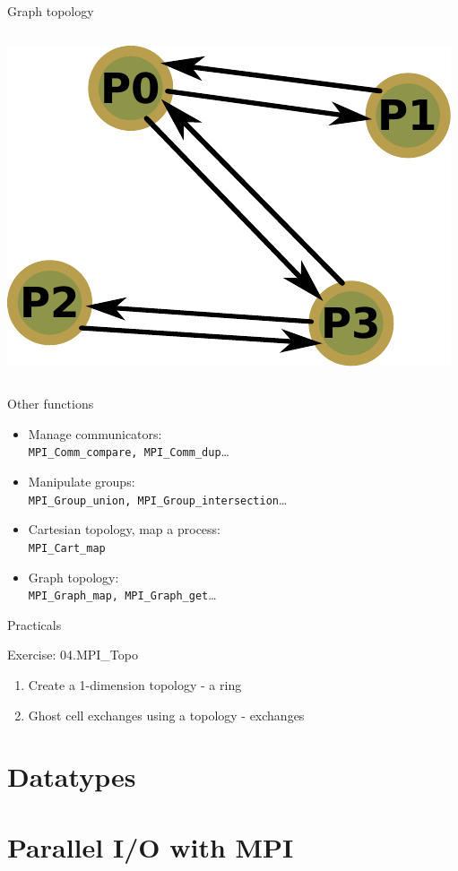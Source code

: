 \documentclass[aspectratio=43]{beamer}
\begin{document}
\begin{frame}[fragile]{Graph topology}
\begin{columns}
    \begin{column}{0.2\paperwidth}
\includegraphics[scale=0.36]{04.MPI_Topo/graph.pdf}
    \end{column}
\end{columns}

\end{frame}


\begin{frame}[fragile]{Other functions}
\begin{itemize}
    \item Manage communicators:\\\hspace{1cm}\verb+MPI_Comm_compare, MPI_Comm_dup+\ldots
    \item Manipulate groups:\\\hspace{1cm}\verb+MPI_Group_union, MPI_Group_intersection+\ldots
    \item Cartesian topology, map a process:\\\hspace{1cm}\verb+MPI_Cart_map+
    \item Graph topology:\\\hspace{1cm}\verb+MPI_Graph_map, MPI_Graph_get+\ldots
\end{itemize}
\end{frame}


\begin{frame}{Practicals}
    \begin{brown2block}{Exercise: 04.MPI\_Topo}
    \begin{enumerate}
        \item Create a 1-dimension topology - a ring
        \item Ghost cell exchanges using a topology - exchanges
    \end{enumerate}
    \end{brown2block}
\end{frame}



\section{Datatypes}
\section{Parallel I/O with MPI}

\end{document}
